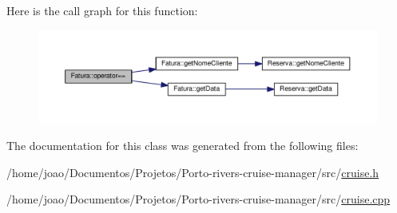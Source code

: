 Here is the call graph for this function\+:
\nopagebreak
\begin{figure}[H]
\begin{center}
\leavevmode
\includegraphics[width=350pt]{classFatura_a337e1169c75de3089dcf3e16ee179aa3_cgraph}
\end{center}
\end{figure}




The documentation for this class was generated from the following files\+:\begin{DoxyCompactItemize}
\item 
/home/joao/\+Documentos/\+Projetos/\+Porto-\/rivers-\/cruise-\/manager/src/\hyperlink{cruise_8h}{cruise.\+h}\item 
/home/joao/\+Documentos/\+Projetos/\+Porto-\/rivers-\/cruise-\/manager/src/\hyperlink{cruise_8cpp}{cruise.\+cpp}\end{DoxyCompactItemize}
